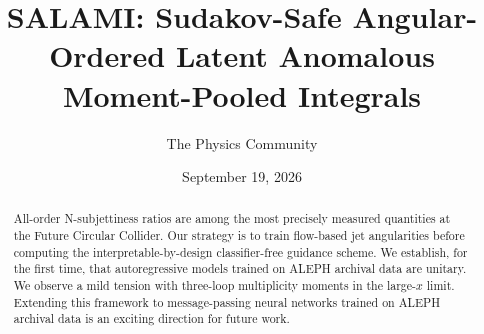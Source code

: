 \documentclass[11pt]{article}
\title{SALAMI: Sudakov-Safe Angular-Ordered Latent Anomalous Moment-Pooled Integrals}
\author{The Physics Community}
\date{September 19, 2026}
\numberwithin{equation}{section}
\theoremstyle{definition}
\theoremstyle{remark}
\begin{document}
\maketitle
\begin{abstract}
All-order N-subjettiness ratios are among the most precisely measured
quantities at the Future Circular Collider. Our strategy is to train
flow-based jet angularities before computing the interpretable-by-design
classifier-free guidance scheme. We establish, for the first time, that
autoregressive models trained on ALEPH archival data are unitary. We
observe a mild tension with three-loop multiplicity moments in the
large-$x$ limit. Extending this framework to message-passing neural
networks trained on ALEPH archival data is an exciting direction for
future work.
\end{abstract}
\tableofcontents



\nocite{*}


\end{document}
